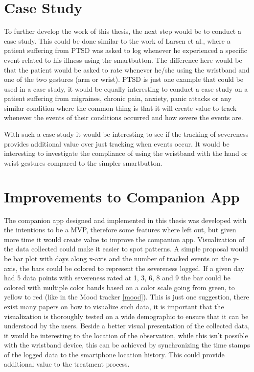 \section{Case Study}
To further develop the work of this thesis, the next step would be to conduct a case study. This could be done similar to the work of Larsen et al.\cite{eg}, where a patient suffering from PTSD was asked to log whenever he experienced a specific event related to his illness using the smartbutton. The difference here would be that the patient would be asked to rate whenever he/she using the wristband and one of the two gestures (arm or wrist). PTSD is just one example that could be used in a case study, it would be equally interesting to conduct a case study on a patient suffering from migraines, chronic pain, anxiety, panic attacks or any similar condition where the common thing is that it will create value to track whenever the events of their conditions occurred and how severe the events are.

With such a case study it would be interesting to see if the tracking of severeness provides additional value over just tracking when events occur. It would be interesting to investigate the compliance of using the wristband with the hand or wrist gestures compared to the simpler smartbutton.

\section{Improvements to Companion App}
The companion app designed and implemented in this thesis was developed with the intentions to be a MVP, therefore some features where left out, but given more time it would create value to improve the companion app. Visualization of the data collected could make it easier to spot patterns. A simple proposal would be bar plot with days along x-axis and the number of tracked events on the y-axis, the bars could be colored to represent the severeness logged. If a given day had 5 data points with severeness rated at 1, 3, 6, 8 and 9 the bar could be colored with multiple color bands based on a color scale going from green, to yellow to red (like in the Mood tracker \ref{mood}). This is just one suggestion, there exist many papers on how to visualize such data, it is important that the visualization is thoroughly tested on a wide demographic to ensure that it can be understood by the users. Beside a better visual presentation of the collected data, it would be interesting to the location of the observation, while this isn't possible with the wristband device, this can be achieved by synchronizing the time stamps of the logged data to the smartphone location history. This could provide additional value to the treatment process. 

